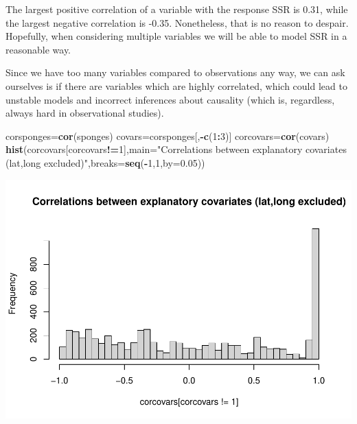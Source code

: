 \documentclass[
]{book}
\newenvironment{Shaded}{\begin{snugshade}}{\end{snugshade}}
\newcommand{\AttributeTok}[1]{\textcolor[rgb]{0.13,0.29,0.53}{#1}}
\newcommand{\DecValTok}[1]{\textcolor[rgb]{0.00,0.00,0.81}{#1}}
\newcommand{\FloatTok}[1]{\textcolor[rgb]{0.00,0.00,0.81}{#1}}
\newcommand{\FunctionTok}[1]{\textcolor[rgb]{0.13,0.29,0.53}{\textbf{#1}}}
\newcommand{\NormalTok}[1]{#1}
\newcommand{\OtherTok}[1]{\textcolor[rgb]{0.56,0.35,0.01}{#1}}
\newcommand{\SpecialCharTok}[1]{\textcolor[rgb]{0.81,0.36,0.00}{\textbf{#1}}}
\newcommand{\StringTok}[1]{\textcolor[rgb]{0.31,0.60,0.02}{#1}}
\begin{document}
The largest positive correlation of a variable with the response SSR is 0.31, while the largest negative correlation is -0.35. Nonetheless, that is no reason to despair. Hopefully, when considering multiple variables we will be able to model SSR in a reasonable way.

Since we have too many variables compared to observations any way, we can ask ourselves is if there are variables which are highly correlated, which could lead to unstable models and incorrect inferences about causality (which is, regardless, always hard in observational studies).

\begin{Shaded}
\begin{Highlighting}[]
\NormalTok{corsponges}\OtherTok{=}\FunctionTok{cor}\NormalTok{(sponges)}
\NormalTok{covars}\OtherTok{=}\NormalTok{corsponges[,}\SpecialCharTok{{-}}\FunctionTok{c}\NormalTok{(}\DecValTok{1}\SpecialCharTok{:}\DecValTok{3}\NormalTok{)]}
\NormalTok{corcovars}\OtherTok{=}\FunctionTok{cor}\NormalTok{(covars)}
\FunctionTok{hist}\NormalTok{(corcovars[corcovars}\SpecialCharTok{!=}\DecValTok{1}\NormalTok{],}\AttributeTok{main=}\StringTok{"Correlations between explanatory covariates (lat,long excluded)"}\NormalTok{,}\AttributeTok{breaks=}\FunctionTok{seq}\NormalTok{(}\SpecialCharTok{{-}}\DecValTok{1}\NormalTok{,}\DecValTok{1}\NormalTok{,}\AttributeTok{by=}\FloatTok{0.05}\NormalTok{))}
\end{Highlighting}
\end{Shaded}

\includegraphics{ECOMODbook_files/figure-latex/unnamed-chunk-88-1.pdf}
\end{document}
